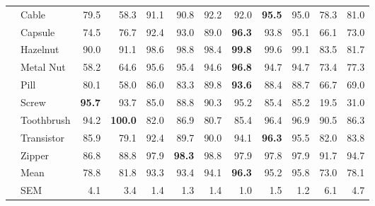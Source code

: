 \documentclass[conference, a4paper]{./template/IEEEtran}
\begin{document}
\begin{table*}[htbp]
\begin{tabular}{@{}llrrrrrrrrrr@{}}
		& Cable      & 79.5                & 58.3           & 91.1                   & 90.8      & 92.2            & 92.0                         	& \textbf{95.5}  & 95.0             & 78.3	& 81.0 \\
		& Capsule    & 74.5                & 76.7           & 92.4                   & 93.0      & 89.0            & \textbf{96.3}                  & 93.8           & 95.1             & 66.1	& 73.0 \\
		& Hazelnut   & 90.0                & 91.1           & 98.6                   & 98.8      & 98.4            & \textbf{99.8}                  & 99.6           & 99.1             & 83.5	& 81.7 \\
		& Metal Nut  & 58.2                & 64.6           & 95.6                   & 95.4      & 94.6			   & \textbf{96.8}                 	& 94.7   		 & 94.7             & 73.4	& 77.3 \\
		& Pill       & 80.1                & 58.0           & 86.0                   & 83.3      & 89.8            & \textbf{93.6}                	& 88.4           & 88.7             & 66.7	& 69.0 \\
		& Screw      & \textbf{95.7}       & 93.7           & 85.0                   & 88.8      & 90.3            & 95.2                         	& 85.4           & 85.2             & 19.5	& 31.0 \\
		& Toothbrush & 94.2                & \textbf{100.0} & 82.0                   & 86.9      & 80.7            & 85.4                			& 96.4           & 96.9             & 90.5	& 86.3 \\
		& Transistor & 85.9                & 79.1           & 92.4                   & 89.7      & 90.0            & 94.1                       	& \textbf{96.3}  & 95.5             & 82.0	& 83.8 \\
		& Zipper     & 86.8                & 88.8           & 97.9                   & \textbf{98.3}      & 98.8            & 97.9              	& 97.8           & 97.9             & 91.7	& 94.7 \\
		\midrule
		& Mean       & 78.8                & 81.8           & 93.3                   & 93.4      & 94.1            & \textbf{96.3}                	& 95.2           &  95.8	        & 73.0	& 78.1 \\
		& SEM        & 4.1                 & 3.4            & 1.4                    & 1.3       & 1.4             & 1.0                  			& 1.5            &  1.2             & 6.1	& 4.7  \\
		\bottomrule
	\end{tabular}
\end{table*}
\end{document}
